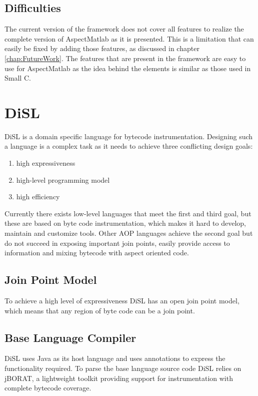 \documentclass[a4paper]{report}
\begin{document}
\section{Difficulties}
The current version of the framework does not cover all features to realize the complete version of AspectMatlab as it is presented. This is a limitation that can easily be fixed by adding those features, as discussed in chapter \ref{chap:FutureWork}. The features that are present in the framework are easy to use for AspectMatlab as the idea behind the elements is similar as those used in Small C.

\chapter{DiSL}
DiSL \citep{marek_disl:_2012} is a domain specific language for bytecode instrumentation. Designing such a language is a complex task as it needs to achieve three conflicting design goals:
\begin{enumerate}
\item high expressiveness
\item high-level programming model
\item high efficiency
\end{enumerate}
Currently there exists low-level languages that meet the first and third goal, but these are based on byte code instrumentation, which makes it hard to develop, maintain and customize tools. Other AOP languages achieve the second goal but do not succeed in exposing important join points, easily provide access to information and mixing bytecode with aspect oriented code.

\section{Join Point Model}
To achieve a high level of expressiveness DiSL has an open join point model, which means that any region of byte code can be a join point.

\section{Base Language Compiler}
DiSL uses Java as its host language and uses annotations to express the functionality required. To parse the base language source code DiSL relies on jBORAT, a lightweight toolkit providing support for instrumentation with complete bytecode coverage.
\end{document}
